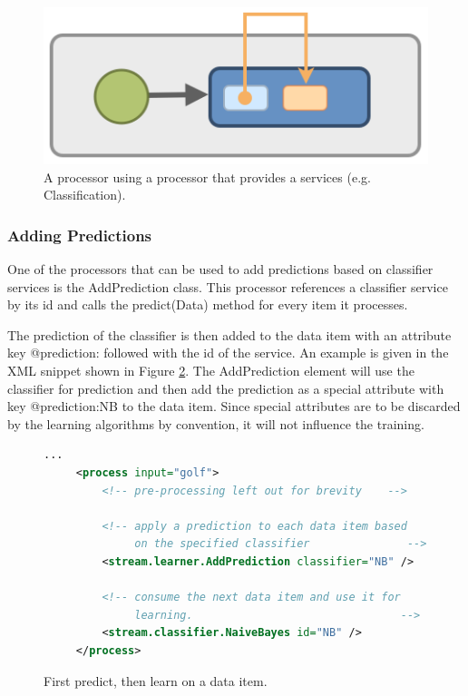 \begin{figure}[h!]
  \centering
  \includegraphics[scale=0.3]{graphics/add-prediction.png}
  \caption{\label{fig:serviceProcessors}A processor using a processor
    that provides a services (e.g. Classification).}
\end{figure}

\subsubsection*{Adding Predictions}
One of the processors that can be used to add predictions based on
classifier services is the {\ttfamily AddPrediction} class. This
processor references a classifier service by its {\ttfamily id} and
calls the {\ttfamily predict(Data)} method for every item it
processes.

The prediction of the classifier is then added to the data item with
an attribute key {\ttfamily @prediction:} followed with the {\ttfamily
  id} of the service. An example is given in the XML snippet shown in
Figure \ref{fig:applyPrediction}. The {\ttfamily AddPrediction} element
will use the classifier for prediction and then add the prediction as
a special attribute with key {\ttfamily @prediction:NB} to the data item.
Since special attributes are to be discarded by the learning algorithms
by convention, it will not influence the training.
\begin{figure}[h!]
  \centering
  \begin{lstlisting}[language=XML]
     ...
     <process input="golf">
         <!-- pre-processing left out for brevity    -->

         <!-- apply a prediction to each data item based
              on the specified classifier               -->
         <stream.learner.AddPrediction classifier="NB" />

         <!-- consume the next data item and use it for
              learning.                                -->
         <stream.classifier.NaiveBayes id="NB" />
     </process>
  \end{lstlisting}
  \caption{\label{fig:applyPrediction}First predict, then learn on a data item.}
\end{figure}
